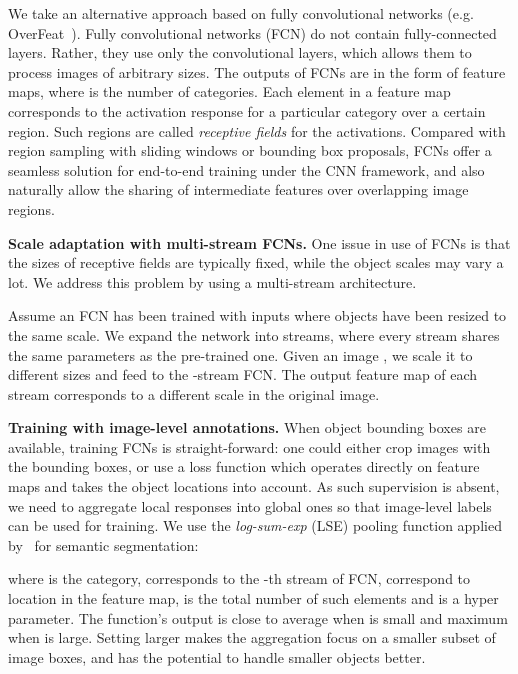 \documentclass[10pt,twocolumn,letterpaper]{article}
\begin{document}
We take an alternative approach based on fully convolutional networks (e.g. OverFeat~\cite{DBLP:journals/corr/SermanetEZMFL13}). Fully convolutional networks (FCN) do not contain fully-connected layers. Rather, they use only the convolutional layers, which allows them to process images of arbitrary sizes. The outputs of FCNs are in the form of  feature maps, where  is the number of categories. Each element in a feature map corresponds to the activation response for a particular category over a certain region. Such regions are called \textit{receptive fields} for the activations. Compared with region sampling with sliding windows or bounding box proposals, FCNs offer a seamless solution for end-to-end training under the CNN framework, and also naturally allow the sharing of intermediate features over overlapping image regions.

\textbf{Scale adaptation with multi-stream FCNs.} One issue in use of FCNs is that the sizes of receptive fields are typically fixed, while the object scales may vary a lot. We address this problem by using a multi-stream architecture. 

Assume an FCN has been trained with inputs where objects have been resized to the same scale. We expand the network into  streams, where every stream shares the same parameters as the pre-trained one. Given an image , we scale it to different sizes  and feed to the -stream FCN. The output feature map of each stream corresponds to a different scale in the original image.









\textbf{Training with image-level annotations.} When object bounding boxes are available, training FCNs is straight-forward: one could either crop images with the bounding boxes, or use a loss function which operates directly on feature maps and takes the object locations into account. As such supervision is absent, we need to aggregate local responses into global ones so that image-level labels can be used for training. We use the \textit{log-sum-exp} (LSE) pooling function applied by~\cite{pinheiro:2015a} for semantic segmentation:

where  is the category,  corresponds to the -th stream of FCN,  correspond to location in the feature map,  is the total number of such elements and  is a hyper parameter. The function's output is close to average when  is small and maximum when  is large. Setting  larger makes the aggregation focus on a smaller subset of image boxes, and has the potential to handle smaller objects better.
\end{document}
